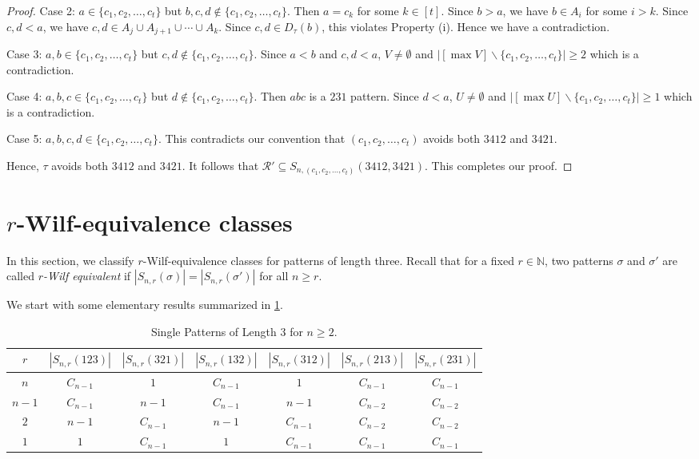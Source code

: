 \documentclass[11pt]{article}
\theoremstyle{definition}
\numberwithin{equation}{section}
\begin{document}
\begin{proof}
    Case 2: $a\in\{c_1,c_2,\ldots,c_t\}$ but $b,c,d\notin\{c_1,c_2,\ldots,c_t\}$. Then $a=c_k$ for some $k\in[t]$. Since $b>a$, we have $b\in A_{i}$ for some $i>k$. Since $c,d<a$, we have $c,d\in A_j\cup A_{j+1}\cup\cdots \cup A_{k}$. Since $c,d\in D_\tau(b)$, this violates Property (i). Hence we have a contradiction.

    Case 3: $a,b\in\{c_1,c_2,\ldots,c_t\}$ but $c,d\notin\{c_1,c_2,\ldots,c_t\}$. Since $a<b$ and $c,d<a$, $V\neq\emptyset$ and $\left|[\max V]\backslash\{c_1,c_2,\ldots,c_t\}\right|\geq2$ which is a contradiction.

    Case 4: $a,b,c\in\{c_1,c_2,\ldots,c_t\}$ but $d\notin\{c_1,c_2,\ldots,c_t\}$. Then $abc$ is a $231$ pattern. Since $d<a$, $U\neq\emptyset$ and $\left|[\max U]\backslash\{c_1,c_2,\ldots,c_t\}\right|\geq1$ which is a contradiction.

    Case 5: $a,b,c,d\in\{c_1,c_2,\ldots,c_t\}$. This contradicts our convention that $(c_1,c_2,\ldots,c_t)$ avoids both $3412$ and $3421$.

    Hence, $\tau$ avoids both $3412$ and $3421$. It follows that $\mathcal{R}'\subseteq S_{n,(c_1,c_2,\ldots,c_t)}(3412,3421)$. This completes our proof.
\end{proof}

\section{$r$-Wilf-equivalence classes}\label{Section:LeadingWilf}
In this section, we classify $r$-Wilf-equivalence classes for patterns of length three. Recall that for a fixed $r\in\mathbb{N}$, two patterns $\sigma$ and $\sigma'$ are 
called {\em $r$-Wilf equivalent} if $|S_{n,r}(\sigma)|=|S_{n,r}(\sigma')|$ for all 
$n\geq r$.

We start with some elementary results summarized in \cref{Table:SingleClassical}.
\begin{table}[H]
\centering
\begin{tabular}{|c||c|c|c|c|c|c|}
\hline
$r$&$|S_{n,r}(123)|$&$|S_{n,r}(321)|$&$|S_{n,r}(132)|$&$|S_{n,r}(312)|$&$|S_{n,r}(213)|$&$|S_{n,r}(231)|$\\
\hline\hline
$n$&$C_{n-1}$&$1$&$C_{n-1}$&$1$&$C_{n-1}$&$C_{n-1}$\\
\hline
$n-1$&$C_{n-1}$&$n-1$&$C_{n-1}$&$n-1$&$C_{n-2}$&$C_{n-2}$\\\hline
$2$&$n-1$&$C_{n-1}$&$n-1$&$C_{n-1}$&$C_{n-2}$&$C_{n-2}$\\\hline
$1$&$1$&$C_{n-1}$&$1$&$C_{n-1}$&$C_{n-1}$&$C_{n-1}$\\\hline
\end{tabular}
\caption{Single Patterns of Length $3$ for $n\geq2$.}\label{Table:SingleClassical}
\end{table}
\end{document}
